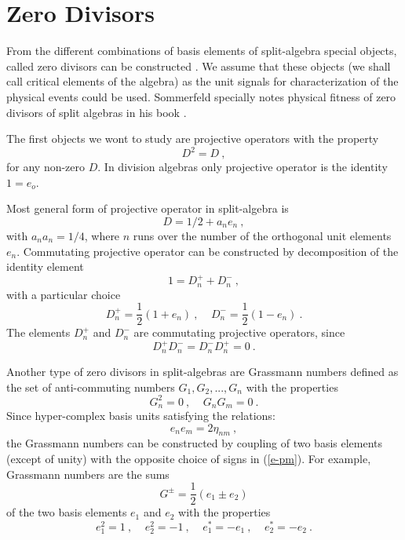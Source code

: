 \documentclass[a4paper,12pt]{article}
\begin{document}

\section{Zero Divisors}

From the different combinations of basis elements of split-algebra special objects, called 
zero divisors can be constructed \cite{Sc, SoLo}. We assume that these objects (we shall 
call critical elements of the algebra) as the unit signals for characterization of the 
physical events could be used. Sommerfeld specially notes physical fitness of zero divisors 
of split algebras in his book \cite{So}. 

The first objects we wont to study are projective operators with the property 
\begin{equation} \label{D}
D^2 = D ~,
\end{equation}
for any non-zero $D$. In division algebras only projective operator is the identity $1 = e_o$.

Most general form of projective operator in split-algebra is 
\begin{equation} \label{anen}
D = 1/2 + a_n e_n ~,
\end{equation}
with $a_na_n = 1/4$, where $n$ runs over the number of the orthogonal unit elements $e_n$. 
Commutating projective operator can be constructed by decomposition of the identity element 
\begin{equation} \label{1}
1 = D^+_n + D^-_n ~,
\end{equation}
with a particular choice 
\begin{equation} \label{D=pm}
D^+_n = \frac{1}{2}(1 + e_n)~, ~~~~~D^-_n = \frac{1}{2}(1 - e_n) ~.
\end{equation}
The elements $D^+_n$ and $D^-_n$ are commutating projective operators, since 
\begin{equation} \label{commuting}
D^+_nD^-_n = D^-_nD^+_n = 0 ~.
\end{equation}

Another type of zero divisors in split-algebras are Grassmann numbers defined as the set of 
anti-commuting numbers ${G_1, G_2, ...,G_n }$ with the properties 
\begin{equation} \label{G}
G^2_n = 0~, ~~~~~{G_n G_m} = 0~. 
\end{equation}
Since hyper-complex basis units satisfying the relations:
\begin{equation} \label{ee=eta}
e_n e_m = 2\eta_{nm}~, 
\end{equation}
the Grassmann numbers can be constructed by coupling of two basis elements (except of unity) 
with the opposite choice of signs in (\ref{e-pm}). For example, Grassmann numbers are the 
sums 
\begin{equation} \label{G-pm}
G^\pm = \frac{1}{2}(e_1 \pm e_2)
\end{equation}
of the two basis elements $e_1$ and $e_2$ with the properties
\begin{equation} \label{e12}
e_1^2 = 1 ~, ~~~~~ e_2^2 = -1 ~, ~~~~~ e_1^* = - e_1 ~, ~~~~~ e_2^* = - e_2~.
\end{equation}
\end{document}
